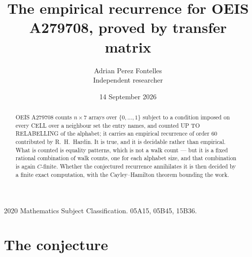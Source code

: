 \documentclass[11pt,a4paper]{article}
\title{The empirical recurrence for OEIS A279708, proved by transfer matrix}
\author{Adrian Perez Fontelles\\ \small Independent researcher}
\date{14 September 2026}
\theoremstyle{plain}
\theoremstyle{definition}
\begin{document}
\maketitle

\begin{abstract}
OEIS A279708 counts $n\times7$ arrays over $\{0,\dots,1\}$ subject to a condition imposed on
every CELL over a neighbour set the entry names, and counted UP TO RELABELLING of the
alphabet; it carries an empirical recurrence of order $60$ contributed by
R.~H.~Hardin. It is true, and it is decidable rather than empirical. What is counted is
equality patterns, which is not a walk count --- but it is a fixed rational combination of
walk counts, one for each alphabet size, and that combination is again $C$-finite. Whether the
conjectured recurrence annihilates it is then decided by a finite exact computation, with the
Cayley--Hamilton theorem bounding the work.
\end{abstract}

\noindent\small 2020 Mathematics Subject Classification. 05A15, 05B45, 15B36.\normalsize

\section{The conjecture}
\end{document}
